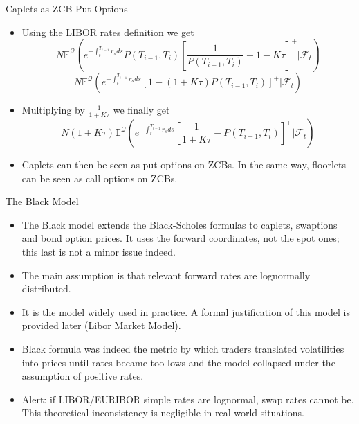\documentclass{beamer}
\begin{document}
\begin{frame}{Caplets as ZCB Put Options}
	\begin{itemize}
		\item Using the LIBOR rates definition we get
		\begin{equation}
			N\mathbb{E}^{\mathcal{Q}}\left(e^{-\int_t^{T_{i-1}}r_s ds}P(T_{i-1},T_i)\left[\frac{1}{P(T_{i-1},T_i)}-1-K\tau\right]^+ | \mathcal{F}_t\right)
		\end{equation}
		\begin{equation}
			N\mathbb{E}^{\mathcal{Q}}\left(e^{-\int_t^{T_{i-1}}r_s ds}\left[1-(1+K\tau)P(T_{i-1},T_i)\right]^+ | \mathcal{F}_t\right)
		\end{equation}
		\item Multiplying by $\frac{1}{1+K\tau}$ we finally get
		\begin{equation}
			N(1+K\tau)\mathbb{E}^{\mathcal{Q}}\left(e^{-\int_t^{T_{i-1}}r_s ds}\left[\frac{1}{1+K\tau}-P(T_{i-1},T_i)\right]^+ | \mathcal{F}_t\right)
		\end{equation}
		\item Caplets can then be seen as put options on ZCBs. In the same way, floorlets can be seen as call options on ZCBs.
	\end{itemize}
\end{frame}

\begin{frame}{The Black Model}
	\begin{itemize}
		\item The Black model extends the Black-Scholes formulas to caplets, swaptions and bond option prices. It uses the forward coordinates, not the spot ones; this last is not a minor issue indeed.
		\item The main assumption is that relevant forward rates are lognormally distributed.
		\item It is the model widely used in practice. A formal justification of this model is provided later (Libor Market Model).
		\item Black formula was indeed the metric by which traders translated volatilities into prices until rates became too lows and the model collapsed under the assumption of positive rates.
		\item Alert: if LIBOR/EURIBOR simple rates are lognormal, swap rates cannot be. This theoretical inconsistency is negligible in real world situations.
	\end{itemize}
\end{frame}
\end{document}
